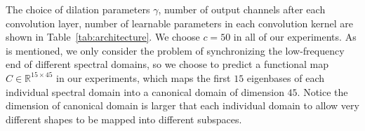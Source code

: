 The choice of dilation parameters $\gamma$, number of output channels after each convolution layer, number of learnable parameters in each convolution kernel are shown in Table~\ref{tab:architecture}. We choose $c=50$ in all of our experiments. As is mentioned, we only consider the problem of synchronizing the low-frequency end of different spectral domains, so we choose to predict a functional map $C\in\mathbb{R}^{15\times45}$ in our experiments, which maps the first $15$ eigenbases of each individual spectral domain into a canonical domain of dimension $45$. Notice the dimension of canonical domain is larger that each individual domain to allow very different shapes to be mapped into different subspaces.

